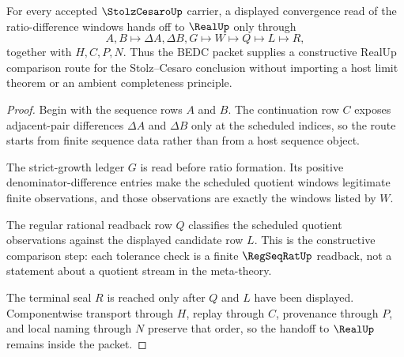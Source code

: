 \begin{theorem}
\label{thm:stolz-cesaro-real-handoff}
For every accepted $\StolzCesaroUp$ carrier, a displayed convergence read of the ratio-difference windows hands off to $\RealUp$ only through
$$
A,B\longmapsto \Delta A,\Delta B,G\longmapsto W\longmapsto Q\longmapsto L\longmapsto R,
$$
together with $H,C,P,N$. Thus the BEDC packet supplies a constructive RealUp comparison route for the Stolz--Cesaro conclusion without importing a host limit theorem or an ambient completeness principle.
\end{theorem}
\begin{proof}
Begin with the sequence rows $A$ and $B$. The continuation row $C$ exposes adjacent-pair differences $\Delta A$ and $\Delta B$ only at the scheduled indices, so the route starts from finite sequence data rather than from a host sequence object.

The strict-growth ledger $G$ is read before ratio formation. Its positive denominator-difference entries make the scheduled quotient windows legitimate finite observations, and those observations are exactly the windows listed by $W$.

The regular rational readback row $Q$ classifies the scheduled quotient observations against the displayed candidate row $L$. This is the constructive comparison step: each tolerance check is a finite $\RegSeqRatUp$ readback, not a statement about a quotient stream in the meta-theory.

The terminal seal $R$ is reached only after $Q$ and $L$ have been displayed. Componentwise transport through $H$, replay through $C$, provenance through $P$, and local naming through $N$ preserve that order, so the handoff to $\RealUp$ remains inside the packet.
\end{proof}



